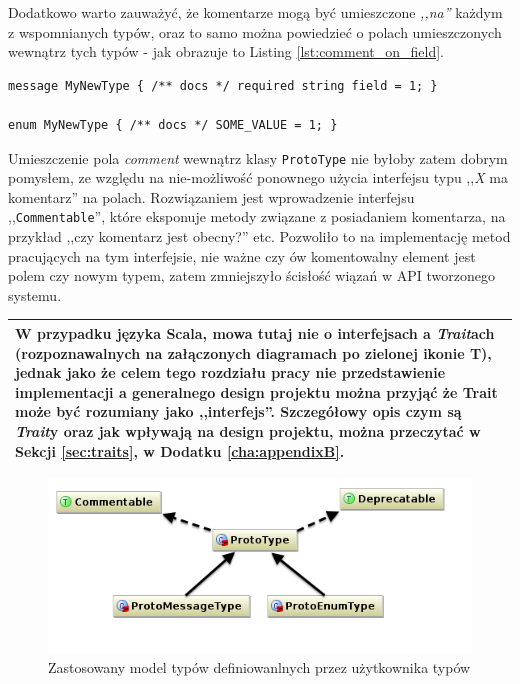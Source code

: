 \documentclass[pdflatex,11pt]{aghdpl}
\begin{document}
Dodatkowo warto zauważyć, że komentarze mogą być umieszczone \textit{,,na''} każdym z wspomnianych typów,
oraz to samo można powiedzieć o polach umieszczonych wewnątrz tych typów - jak obrazuje to Listing \ref{lst:comment_on_field}.

\begin{lstlisting}[caption = {Przykład umieszczenia komentarza ProtoDoc na polach wiadomości oraz enumeracji}, label = {lst:comment_on_field}]
message MyNewType { /** docs */ required string field = 1; }

enum MyNewType { /** docs */ SOME_VALUE = 1; }
\end{lstlisting}

Umieszczenie pola \textit{comment} wewnątrz klasy \verb|ProtoType| nie byłoby zatem dobrym pomysłem, ze względu na nie-możliwość ponownego użycia 
interfejsu typu ,,\textit{X} ma komentarz'' na polach. Rozwiązaniem jest wprowadzenie interfejsu ,,\verb|Commentable|'', które eksponuje metody związane
z posiadaniem komentarza, na przykład ,,czy komentarz jest obecny?'' etc. Pozwoliło to na implementację metod pracujących na tym interfejsie, 
nie ważne czy ów komentowalny element jest polem czy nowym typem, zatem zmniejszyło ścisłość wiązań w API tworzonego systemu. 

\begin{center}
\begin{tabular}{|p{\textwidth}|}
\hline
\hline
W przypadku języka Scala, mowa tutaj nie o interfejsach a \textit{Trait}ach (rozpoznawalnych na załączonych diagramach po zielonej ikonie \textbf{T}), 
jednak jako że celem tego rozdziału pracy nie przedstawienie implementacji a generalnego design projektu można przyjąć że Trait może być rozumiany
jako ,,interfejs''. Szczegółowy opis czym są \textit{Trait}y oraz jak wpływają na design projektu, można przeczytać w Sekcji \ref{sec:traits}, w Dodatku \ref{cha:appendixB}.
\\ \hline
\end{tabular}
\end{center}

\begin{figure}[ch]
\begin{center}
 \includegraphics[width=\textwidth]{proto_types}
\end{center}
\caption{Zastosowany model typów definiowanlnych przez użytkownika typów}
\label{fig:types_diagram}
\end{figure}
\end{document}
